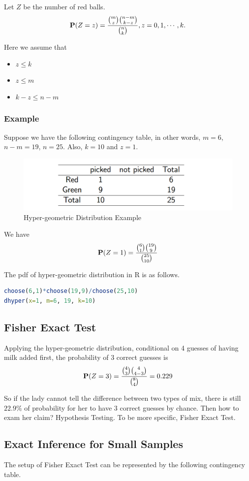 Let $Z$ be the number of red balls.
\[\P(Z = z) = \frac{{m \choose z} {n-m \choose k - z}}{{n \choose k}}, z = 0, 1, \cdots, k.\]

Here we assume that
\begin{itemize}
	\item $z \le k$
	\item $z \le m$
	\item $k - z \le n - m$
\end{itemize}

\subsubsection{Example}

Suppose we have the following contingency table, in other words, $m = 6$, $n - m = 19$, $n = 25$. Also, $k = 10$ and $z = 1$. 
\begin{figure}[H]
	\centering
	\includegraphics[width=0.7\linewidth]{fig/screenshot005}
	\caption{Hyper-geometric Distribution Example}
	\label{fig:screenshot005}
\end{figure}

We have
\[\P(Z = 1) = \frac{{6 \choose 1}{19 \choose 9}}{{25 \choose 10}}\]

The pdf of hyper-geometric distribution in R is as follows.
\begin{lstlisting}[language=R]
choose(6,1)*choose(19,9)/choose(25,10)
dhyper(x=1, m=6, 19, k=10)
\end{lstlisting}
\subsection{Fisher Exact Test}
Applying the hyper-geometric distribution, conditional on 4 guesses of having milk added first, the probability of
3 correct guesses is
\[\P(Z = 3) = \frac{{4 \choose 3}{4 \choose 4 - 3}}{{8 \choose 4}} = 0.229\]

So if the lady cannot tell the difference between two types of mix, there is still $22.9\%$ of probability for her to have 3 correct guesses by chance. Then how to exam her claim? Hypothesis Testing. To be more specific, Fisher Exact Test.

\subsection{Exact Inference for Small Samples}
The setup of Fisher Exact Test can be represented by the following contingency table.

